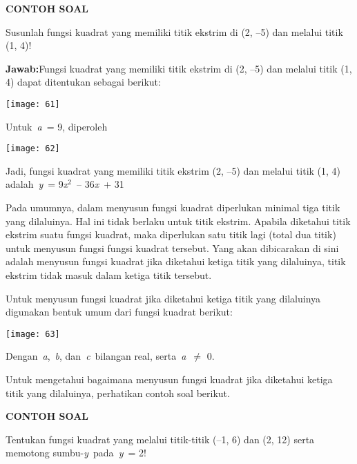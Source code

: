 \documentclass[11pt,fleqn]{book} %
\begin{document}
\begin{myEnumerate}
\begin{itemize}
\noindent \textbf{CONTOH SOAL}

\noindent Susunlah fungsi kuadrat yang memiliki titik ekstrim di (2, --5) dan melalui titik (1, 4)!

\noindent \textbf{Jawab:}Fungsi kuadrat yang memiliki titik ekstrim di (2, --5) dan melalui titik (1, 4) dapat ditentukan sebagai berikut:

\begin{center}
\noindent \texttt{[image: 61]}
\end{center}

\noindent Untuk~\textit{a}~= 9, diperoleh

\begin{center}
\noindent \texttt{[image: 62]}
\end{center}

\noindent Jadi, fungsi kuadrat yang memiliki titik ekstrim (2, --5) dan melalui titik (1, 4) adalah~\textit{y}~= 9\textit{x}${}^{2}$~-- 36\textit{x}~+ 31

\noindent \eject 

Pada umumnya, dalam menyusun fungsi kuadrat diperlukan minimal tiga titik yang dilaluinya. Hal ini tidak berlaku untuk titik ekstrim. Apabila diketahui titik ekstrim suatu fungsi kuadrat, maka diperlukan satu titik lagi (total dua titik) untuk menyusun fungsi fungsi kuadrat tersebut. Yang akan dibicarakan di sini adalah menyusun fungsi kuadrat jika diketahui ketiga titik yang dilaluinya, titik ekstrim tidak masuk dalam ketiga titik tersebut.

\noindent Untuk menyusun fungsi kuadrat jika diketahui ketiga titik yang dilaluinya digunakan bentuk umum dari fungsi kuadrat berikut:

\begin{center}
\noindent \texttt{[image: 63]}
\end{center}

\noindent Dengan~\textit{a},~\textit{b}, dan~\textit{c}~bilangan real, serta~\textit{a}~$\mathrm{\neq}$ 0.

\noindent Untuk mengetahui bagaimana menyusun fungsi kuadrat jika diketahui ketiga titik yang dilaluinya, perhatikan contoh soal berikut.

\noindent \textbf{CONTOH SOAL}

\noindent Tentukan fungsi kuadrat yang melalui titik-titik (--1, 6) dan (2, 12) serta memotong sumbu-\textit{y}~pada~\textit{y}~= 2!


\end{itemize}
\end{myEnumerate}
\end{document}
